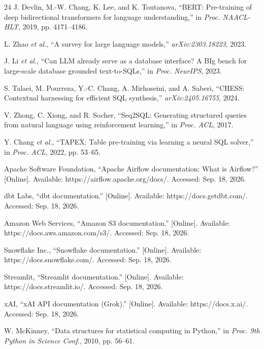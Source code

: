 \documentclass[12pt,a4paper]{report}
\begin{document}
\begin{thebibliography}{24}
 J. Devlin, M.-W. Chang, K. Lee, and K. Toutanova, ``BERT: Pre-training of deep bidirectional transformers for language understanding,'' in \emph{Proc. NAACL-HLT}, 2019, pp. 4171--4186.

 L. Zhao \emph{et al.}, ``A survey for large language models,'' \emph{arXiv:2303.18223}, 2023.

 J. Li \emph{et al.}, ``Can LLM already serve as a database interface? A BIg bench for large-scale database grounded text-to-SQLs,'' in \emph{Proc. NeurIPS}, 2023.

 S. Talaei, M. Pourreza, Y.-C. Chang, A. Mirhoseini, and A. Saberi, ``CHESS: Contextual harnessing for efficient SQL synthesis,'' \emph{arXiv:2405.16755}, 2024.

 V. Zhong, C. Xiong, and R. Socher, ``Seq2SQL: Generating structured queries from natural language using reinforcement learning,'' in \emph{Proc. ACL}, 2017.

 Y. Chang \emph{et al.}, ``TAPEX: Table pre-training via learning a neural SQL solver,'' in \emph{Proc. ACL}, 2022, pp. 53--65.

 Apache Software Foundation, ``Apache Airflow documentation: What is Airflow?'' [Online]. Available: https://airflow.apache.org/docs/. Accessed: Sep. 18, 2026.

 dbt Labs, ``dbt documentation.'' [Online]. Available: https://docs.getdbt.com/. Accessed: Sep. 18, 2026.

 Amazon Web Services, ``Amazon S3 documentation.'' [Online]. Available: https://docs.aws.amazon.com/s3/. Accessed: Sep. 18, 2026.

 Snowflake Inc., ``Snowflake documentation.'' [Online]. Available: https://docs.snowflake.com/. Accessed: Sep. 18, 2026.

 Streamlit, ``Streamlit documentation.'' [Online]. Available: https://docs.streamlit.io/. Accessed: Sep. 18, 2026.

 xAI, ``xAI API documentation (Grok).'' [Online]. Available: https://docs.x.ai/. Accessed: Sep. 18, 2026.

 W. McKinney, ``Data structures for statistical computing in Python,'' in \emph{Proc. 9th Python in Science Conf.}, 2010, pp. 56--61.

\end{thebibliography}

\clearpage
\end{document}
